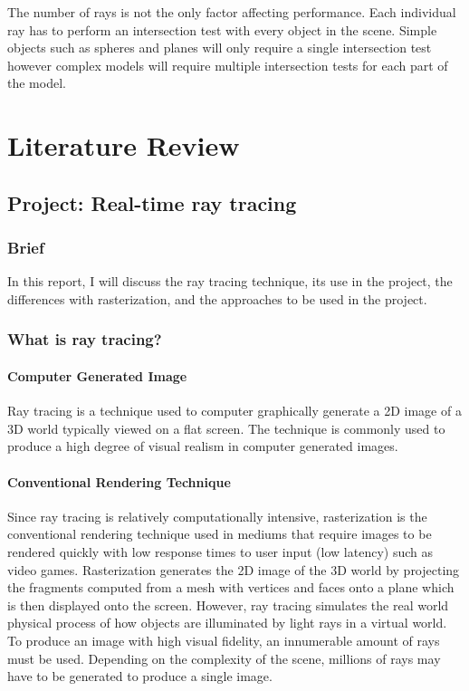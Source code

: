 \documentclass[final]{cmpreport}
\begin{document}
The number of rays is not the only factor affecting performance. Each individual ray has to perform an intersection test with every object in the scene. Simple objects such as spheres and planes will only require a single intersection test however complex models will require multiple intersection tests for each part of the model.

\section{Literature Review}
\subsection{Project: Real-time ray tracing}
\subsubsection{Brief}
In this report, I will discuss the ray tracing technique, its use in the project, the differences with rasterization, and the approaches to be used in the project.

\subsubsection{What is ray tracing?}
\paragraph{Computer Generated Image} Ray tracing is a technique used to computer graphically generate a 2D image of a 3D world typically viewed on a flat screen. The technique is commonly used to produce a high degree of visual realism in computer generated images.

\paragraph{Conventional Rendering Technique} Since ray tracing is relatively computationally intensive, rasterization is the conventional rendering technique used in mediums that require images to be rendered quickly with low response times to user input (low latency) such as video games. Rasterization generates the 2D image of the 3D world by projecting the fragments computed from a mesh with vertices and faces onto a plane which is then displayed onto the screen. However, ray tracing simulates the real world physical process of how objects are illuminated by light rays in a virtual world. To produce an image with high visual fidelity, an innumerable amount of rays must be used. Depending on the complexity of the scene, millions of rays may have to be generated to produce a single image.
\end{document}
